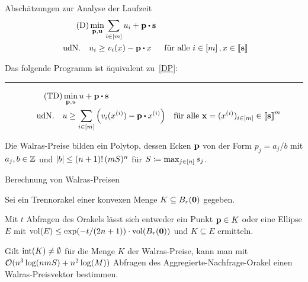 \begin{frame}{Abschätzungen zur Analyse der Laufzeit}
	\vspace{-1em}
	\begin{align*}
		\tag{D}
		&\min_{\fp,\fu} \sum_{i\in\first{m}} u_i + \fp \bcdot \fs \\
		\text{udN.} \quad &  u_i \geq v_i(x) - \fp \bcdot x & \text{für alle $i\in\first{m}, x\in\ffirst{\fs}$}
	\end{align*}
	\begin{lemma}
		Das folgende Programm ist äquivalent zu~\eqref{DP}:
		\vspace{5pt}
		\hrule
		\begin{align*}
		\tag{TD}\label{TDP}
		&\min_{\fp, u} u + \fp \bcdot \fs \\
		\text{udN.}\quad& u \geq \sum_{i\in\first{m}} \left( v_i(x^{(i)}) - \fp \bcdot x^{(i)} \right) & \text{für alle $\fx = (x^{(i)})_{i\in\first{m}}\in\ffirst{\fs}^m$}
		\end{align*}
	\end{lemma}
	\begin{lemma}
		Die Walras-Preise bilden ein Polytop, dessen Ecken $\mathbf{p}$ von der Form $p_j=a_j/b$ mit $a_j,b\in\mathbb{Z}$ und $\lvert b\rvert\leq (n+1)!\, (mS)^n$ für $S\coloneqq\max_{j\in\left[ n \right]} s_j$.
	\end{lemma}
\end{frame}

\begin{frame}{Berechnung von Walras-Preisen}
	\begin{theorem}
		Sei ein Trennorakel einer konvexen Menge $K\subseteq B_r(\mathbf{0})$ gegeben.
		
		Mit $t$ Abfragen des Orakels lässt sich entweder ein Punkt $\mathbf{p}\in K$ oder eine Ellipse $E$ mit $\operatorname{vol}(E) \leq \exp(-t/(2n+1)) \cdot \operatorname{vol}(B_r(\mathbf{0}))$ und $K\subseteq E$ ermitteln.
	\end{theorem}
	\begin{theorem}
		Gilt $\operatorname{int}(K)\neq \emptyset$ für die Menge $K$ der Walras-Preise, kann man mit $\mathcal{O}(n^3\log(nmS) + n^2\log(M))$ Abfragen des Aggregierte-Nachfrage-Orakel einen Walras-Preisvektor bestimmen.
	\end{theorem}
\end{frame}